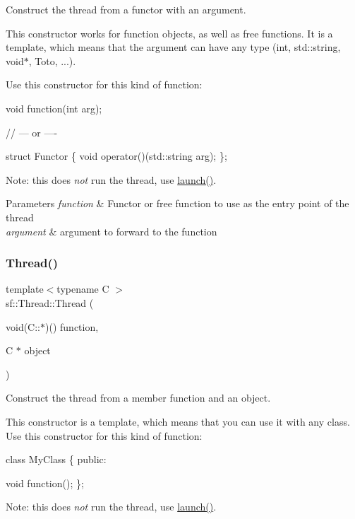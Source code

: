 Construct the thread from a functor with an argument. 

This constructor works for function objects, as well as free functions. It is a template, which means that the argument can have any type (int, std\+::string, void$\ast$, Toto, ...).

Use this constructor for this kind of function\+: 
\begin{DoxyCode}
\textcolor{keywordtype}{void} \textcolor{keyword}{function}(\textcolor{keywordtype}{int} arg);

\textcolor{comment}{// --- or ----}

\textcolor{keyword}{struct }Functor
\{
    \textcolor{keywordtype}{void} operator()(std::string arg);
\};
\end{DoxyCode}
 Note\+: this does {\itshape not} run the thread, use \hyperlink{classsf_1_1_thread_a74f75a9e86e1eb47479496314048b5f6}{launch()}.


\begin{DoxyParams}{Parameters}
{\em function} & Functor or free function to use as the entry point of the thread \\
\hline
{\em argument} & argument to forward to the function \\
\hline
\end{DoxyParams}
\mbox{\label{classsf_1_1_thread_aa9f473c8cbb078900c62b1fd14a83a34}} 
\subsubsection{\texorpdfstring{Thread()}{Thread()}\hspace{0.1cm}{\footnotesize\ttfamily [3/3]}}
{\footnotesize\ttfamily template$<$typename C $>$ \\
sf\+::\+Thread\+::\+Thread (\begin{DoxyParamCaption}\item[{void(C\+::$\ast$)()}]{function,  }\item[{C $\ast$}]{object }\end{DoxyParamCaption})}



Construct the thread from a member function and an object. 

This constructor is a template, which means that you can use it with any class. Use this constructor for this kind of function\+: 
\begin{DoxyCode}
\textcolor{keyword}{class }MyClass
\{
\textcolor{keyword}{public}:

    \textcolor{keywordtype}{void} \textcolor{keyword}{function}();
\};
\end{DoxyCode}
 Note\+: this does {\itshape not} run the thread, use \hyperlink{classsf_1_1_thread_a74f75a9e86e1eb47479496314048b5f6}{launch()}.


